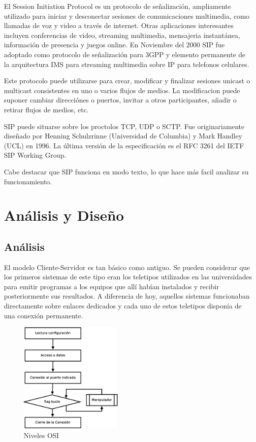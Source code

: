 \documentclass[a4paper,spanish,12pt]{book}
\begin{document}
El Session Initiation Protocol es un protocolo de señalización, ampliamente utilizado para iniciar y desconectar sesiones de comunicaciones multimedia, como llamadas de voz y video a trav\'es de internet. Otras aplicaciones interesantes incluyen conferencias de video, streaming multimedia, mensajeria instantánea, información de presencia y juegos online. En Noviembre del 2000 SIP fue adoptado como protocolo de señalización para 3GPP y elemento permanente de la arquitectura IMS para streaming multimedia sobre IP para telefonos celulares.

Este protocolo puede utilizarse para crear, modificar y finalizar sesiones unicast o multicast consistentes en uno o varios flujos de medios. La modificacion puede suponer cambiar direcciónes o puertos, invitar a otros participantes, añadir o retirar flujos de medios, etc.

SIP puede situarse sobre los proctolos TCP, UDP o SCTP. Fue originariamente diseñado por Henning Schulzrinne (Universidad de Columbia) y Mark Handley (UCL) en 1996. La última versión de la especificación es el \cite{RFCSIP} RFC 3261 del IETF SIP Working Group.

Cabe destacar que SIP funciona en modo texto, lo que hace más facil analizar su funcionamiento.

\chapter{Análisis y Diseño}
\section{Análisis}
El modelo Cliente-Servidor es tan básico como antiguo. Se pueden considerar que los primeros sistemas de este tipo eran los teletipos utilizados en las universidades para emitir programas a los equipos que allí habían instalados y recibir posteriormente sus resultados. A diferencia de hoy, aquellos sistemas funcionaban directamente sobre enlaces dedicados y cada uno de estos teletipos disponía de una conexión permanente.

\begin{figure}
	\includegraphics[width=0.45\textwidth]{img/FlujoServicio.eps}
              \caption{Niveles OSI}
  \label{fig:nivelesOSI}
\end{figure}
\end{document}
